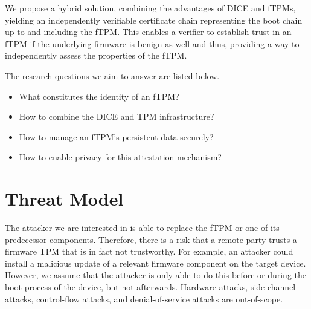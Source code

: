 
We propose a hybrid solution, combining the advantages of \ac{DICE} and \acp{fTPM}, yielding an independently verifiable certificate chain representing the boot chain up to and including the \ac{fTPM}.
This enables a verifier to establish trust in an \ac{fTPM} if the underlying firmware is benign as well and thus, providing a way to independently assess the properties of the \ac{fTPM}.


The research questions we aim to answer are listed below.
\begin{itemize}
  \item What constitutes the identity of an fTPM\@? %
  \item How to combine the DICE and TPM infrastructure? %
  \item How to manage an fTPM's persistent data securely? %
  \item How to enable privacy for this attestation mechanism?
\end{itemize}



\section{Threat Model}



The attacker we are interested in is able to replace the fTPM or one of its predecessor components.
Therefore, there is a risk that a remote party trusts a firmware TPM that is in fact not trustworthy.
For example, an attacker could install a malicious update of a relevant firmware component on the target device.
However, we assume that the attacker is only able to do this before or during the boot process of the device, but not afterwards.
Hardware attacks, side-channel attacks, control-flow attacks, and denial-of-service attacks are out-of-scope.

